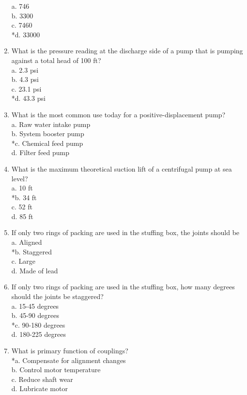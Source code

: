 \begin{enumerate}[1.]
a. 746\\
b. 3300\\
c. 7460\\
*d. 33000\\
\item What is the pressure reading at the discharge side of a pump that is pumping against a total head of 100 ft?\\
a. 2.3 psi\\
b. 4.3 psi\\
c. 23.1 psi\\
*d. 43.3 psi\\
\item What is the most common use today for a positive-displacement pump?\\
a. Raw water intake pump\\
b. System booster pump\\
*c. Chemical feed pump\\
d. Filter feed pump\\
\item What is the maximum theoretical suction lift of a centrifugal pump at sea level?\\
a. 10 ft\\
*b. 34 ft\\
c. 52 ft\\
d. 85 ft\\
\item If only two rings of packing are used in the stuffing box, the joints should be\\
a. Aligned\\
*b. Staggered\\
c. Large\\
d. Made of lead\\
\item If only two rings of packing are used in the stuffing box, how many degrees should the joints be staggered?\\
a. 15-45 degrees\\
b. 45-90 degrees\\
*c. 90-180 degrees\\
d. 180-225 degrees\\
\item What is primary function of couplings?\\
*a. Compensate for alignment changes\\
b. Control motor temperature\\
c. Reduce shaft wear\\
d. Lubricate motor\\

\end{enumerate}
